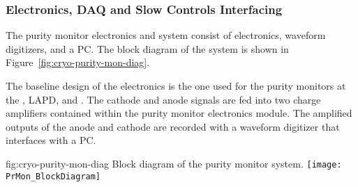 \subsubsection{Electronics, DAQ and Slow Controls Interfacing}
The purity monitor electronics and  system consist of  electronics, waveform digitizers, and a  PC.  The block diagram of the system is shown in Figure~\ref{fig:cryo-purity-mon-diag}.

The baseline design of the  electronics is the one used for the purity monitors at the , LAPD, and \microboone. The cathode and anode signals are fed into two charge amplifiers contained within the purity monitor electronics module.
The amplified outputs of the anode and cathode are recorded with a waveform digitizer that interfaces with a  PC.

\begin{dunefigure}{fig:cryo-purity-mon-diag}
  {Block diagram of the purity monitor system.}
  \texttt{[image: PrMon\_BlockDiagram]}%
\end{dunefigure}

